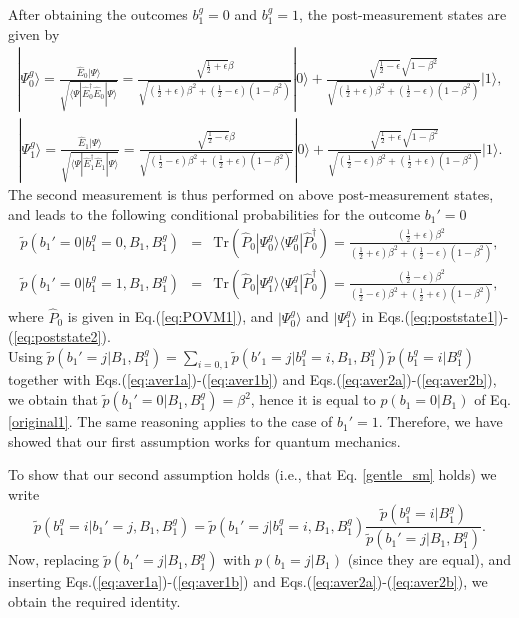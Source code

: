 \documentclass[pra,twocolumn,showpacs,preprintnumbers,amsmath,amssymb,superscriptaddress]{revtex4-1}
\def\be{\begin{equation}}
\def\ee{\end{equation}}
\def\ben{\begin{eqnarray}}
\def\een{\end{eqnarray}}
\def\omeas{B_1}
\def\ogentle{B_1^g}
\newcommand{\ket}[1]{| #1 \rangle}
\newcommand{\bra}[1]{\langle #1 |}
\newcommand{\proj}[1]{| #1 \rangle   \langle #1 |}
\def\tr{\textrm{Tr}}
\begin{document}
\begin{appendix}
After obtaining the outcomes $b_1^{g}=0$ and $b_1^{g}=1$, the post-measurement states are given by
\ben
\label{eq:poststate1}
\ket{\Psi^{g}_0} = \frac{\hat{E}_0 \ket{\Psi}}{\sqrt{\bra{\Psi} \hat{E}^\dagger_0 \hat{E}_0  \ket{\Psi} }}=\frac{\sqrt{\frac12 + \epsilon} \beta}{\sqrt{\left(\frac12 +\epsilon\right) \beta^2 + \left(\frac12 -\epsilon\right)\left(1-\beta^2\right)}} \ket{0} + \frac{\sqrt{\frac12 - \epsilon} \sqrt{1-\beta^2}}{\sqrt{\left(\frac12 +\epsilon\right) \beta^2 + \left(\frac12 -\epsilon\right)\left(1-\beta^2\right)}} \ket{1},
\een
\ben
\label{eq:poststate2}
\ket{\Psi^{g}_1} = \frac{\hat{E}_1 \ket{\Psi}}{\sqrt{\bra{\Psi} \hat{E}^\dagger_1 \hat{E}_1  \ket{\Psi} }}= \frac{\sqrt{\frac12 - \epsilon} \beta}{\sqrt{\left(\frac12 -\epsilon\right) \beta^2 + \left(\frac12 +\epsilon\right)\left(1-\beta^2\right)}} \ket{0} + \frac{\sqrt{\frac12 + \epsilon} \sqrt{1-\beta^2}}{\sqrt{\left(\frac12 -\epsilon\right) \beta^2 + \left(\frac12 +\epsilon\right)\left(1-\beta^2\right)}} \ket{1}.
\een
The second measurement is thus performed on above post-measurement states, and leads to the following conditional probabilities for the outcome $b_1'=0$
\ben
\label{eq:aver2a}
\tilde p(b_1'=0|b_1^{g}=0,\omeas,\ogentle)&=&\tr (\hat{P}_0 \proj{\Psi^{g}_0} \hat{P}^\dagger_0)=\frac{\left(\frac12 +\epsilon\right) \beta^2}{\left(\frac12 +\epsilon\right) \beta^2 + \left(\frac12 -\epsilon\right)\left(1-\beta^2\right)}, \\
\label{eq:aver2b}
\tilde p(b_1'=0|b_1^{g}=1,\omeas,\ogentle)&=&\tr (\hat{P}_0 \proj{\Psi^{g}_1} \hat{P}^\dagger_0)=\frac{\left(\frac12 -\epsilon\right) \beta^2}{\left(\frac12 -\epsilon\right) \beta^2 + \left(\frac12 +\epsilon\right)\left(1-\beta^2\right)},
\een
where $\hat{P}_0$ is given in Eq.(\ref{eq:POVM1}), and $\ket{\Psi^{g}_0}$ and $\ket{\Psi^{g}_1}$ in Eqs.(\ref{eq:poststate1})-(\ref{eq:poststate2}).\\

Using  $\tilde p(b_1'=j|\omeas,\ogentle)=\sum_{i=0,1} \tilde p(b'_1=j|b_1^{g}=i,\omeas,\ogentle) \tilde p(b_1^{g}=i|\ogentle)$ together with  Eqs.(\ref{eq:aver1a})-(\ref{eq:aver1b}) and Eqs.(\ref{eq:aver2a})-(\ref{eq:aver2b}), we obtain that $\tilde p(b_1'=0|\omeas,\ogentle)=\beta^2$, hence it is equal to $p(b_1=0|\omeas)$ of Eq. \eqref{original1}.
The same reasoning applies to the case of $b_1'=1$.
Therefore, we have showed that our first assumption works for quantum mechanics.

To show that our second assumption holds (i.e., that Eq. \eqref{gentle_sm} holds)
we write
\be
\tilde p(b_1^{g}=i|b_1'=j,\omeas,\ogentle)= \tilde p(b_1'=j|b_1^{g}=i,\omeas,\ogentle)  \frac{\tilde p(b_1^{g}=i|\ogentle)}{\tilde p(b_1'=j|\omeas,\ogentle)}.
\ee
Now, replacing  $\tilde p(b_1'=j|\omeas,\ogentle)$ with  $p(b_1=j|\omeas)$ (since they are equal), and inserting
Eqs.(\ref{eq:aver1a})-(\ref{eq:aver1b}) and Eqs.(\ref{eq:aver2a})-(\ref{eq:aver2b}),  we obtain the required identity.



\end{appendix}
\end{document}
